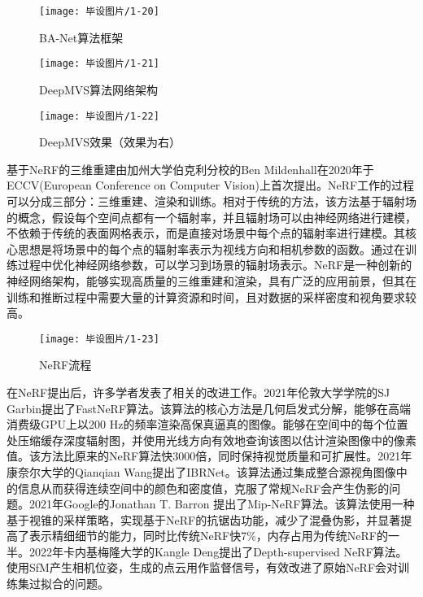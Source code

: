 \begin{figure}[htbp]
    \centering
    \texttt{[image: 毕设图片/1-20]}
    \caption{\label{fig:1-20}BA-Net算法框架\cite{BA-Net}}
\end{figure}

\begin{figure}[htbp]
    \centering
    \texttt{[image: 毕设图片/1-21]}
    \caption{\label{fig:1-21}DeepMVS算法网络架构\cite{Deepmvs}}
\end{figure}

\begin{figure}[htbp]
    \centering
    \texttt{[image: 毕设图片/1-22]}
    \caption{\label{fig:1-22}DeepMVS效果（效果为右）\cite{Deepmvs}}
\end{figure}

基于NeRF的三维重建由加州大学伯克利分校的Ben Mildenhall\cite{Nerf}在2020年于ECCV(European Conference on Computer Vision)上首次提出。NeRF工作的过程可以分成三部分：三维重建、渲染和训练。相对于传统的方法，该方法基于辐射场的概念，假设每个空间点都有一个辐射率，并且辐射场可以由神经网络进行建模，不依赖于传统的表面网格表示，而是直接对场景中每个点的辐射率进行建模。其核心思想是将场景中的每个点的辐射率表示为视线方向和相机参数的函数。通过在训练过程中优化神经网络参数，可以学习到场景的辐射场表示。NeRF是一种创新的神经网络架构，能够实现高质量的三维重建和渲染，具有广泛的应用前景，但其在训练和推断过程中需要大量的计算资源和时间，且对数据的采样密度和视角要求较高。

\begin{figure}[htbp]
    \centering
    \texttt{[image: 毕设图片/1-23]}
    \caption{\label{fig:1-23}NeRF流程\cite{Nerf}}
\end{figure}

在NeRF提出后，许多学者发表了相关的改进工作。2021年伦敦大学学院的SJ Garbin提出了FastNeRF\cite{Fastnerf}算法。该算法的核心方法是几何启发式分解，能够在高端消费级GPU上以200 Hz的频率渲染高保真逼真的图像。能够在空间中的每个位置处压缩缓存深度辐射图，并使用光线方向有效地查询该图以估计渲染图像中的像素值。该方法比原来的NeRF算法快3000倍，同时保持视觉质量和可扩展性。2021年康奈尔大学的Qianqian Wang提出了IBRNet\cite{Ibrnet}。该算法通过集成整合源视角图像中的信息从而获得连续空间中的颜色和密度值，克服了常规NeRF会产生伪影的问题。2021年Google的Jonathan T. Barron 提出了Mip-NeRF\cite{Mip-nerf}算法。该算法使用一种基于视锥的采样策略，实现基于NeRF的抗锯齿功能，减少了混叠伪影，并显著提高了表示精细细节的能力，同时比传统NeRF快7\%，内存占用为传统NeRF的一半。2022年卡内基梅隆大学的Kangle Deng提出了Depth-supervised\cite{Depth-supervised} NeRF算法。使用SfM产生相机位姿，生成的点云用作监督信号，有效改进了原始NeRF会对训练集过拟合的问题。

